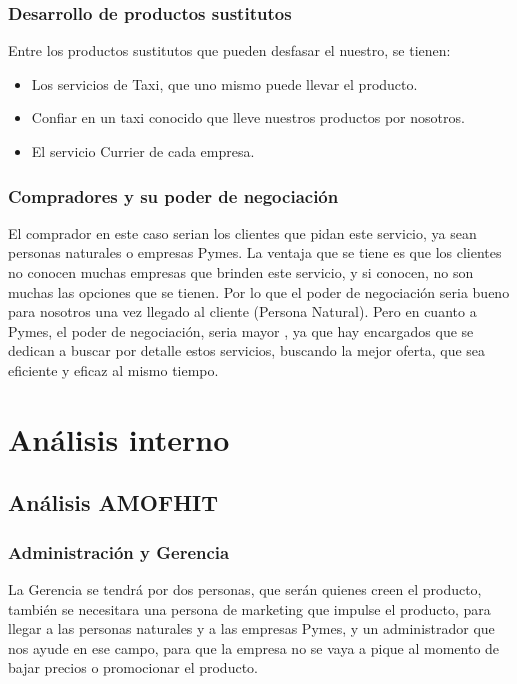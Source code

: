 \subsubsection{Desarrollo de productos sustitutos}
Entre los productos sustitutos que pueden desfasar el nuestro, se tienen:
\begin{itemize}
    \item Los servicios de Taxi, que uno mismo puede llevar el producto.
    \item Confiar en un taxi conocido que lleve nuestros productos por nosotros.
    \item El servicio Currier de cada empresa.
\end{itemize}

\subsubsection{Compradores y su poder de negociación}
El comprador en este caso serian los clientes que pidan este servicio, ya sean personas naturales o empresas Pymes. La ventaja que se tiene es que los clientes no conocen muchas empresas que brinden este servicio, y si conocen, no son muchas las opciones que se tienen. Por lo que el poder de negociación seria bueno para nosotros una vez llegado al cliente (Persona Natural).
Pero en cuanto a Pymes, el poder de negociación, seria mayor , ya que hay encargados que se dedican a buscar por detalle estos servicios, buscando la mejor oferta, que sea eficiente y eficaz al mismo tiempo.
\section{Análisis interno}

\subsection{Análisis AMOFHIT}
\subsubsection{Administración y Gerencia}
La Gerencia se tendrá por dos personas, que serán quienes creen el producto, también se necesitara una persona de marketing que impulse el producto, para llegar a las personas naturales y a las empresas Pymes, y un administrador que nos ayude en ese campo, para que la empresa no se vaya a pique al momento de bajar precios o promocionar el producto. 

